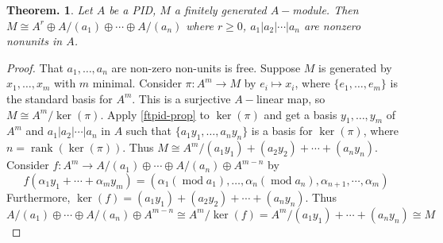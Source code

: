 \documentclass[11pt, a4paper]{memoir}
\theoremstyle{change}
\newtheorem{theorem}{Theorem.}[section]
\theoremstyle{plain}
\theoremstyle{nonumberplain}
\newtheorem{proof}{Proof}
\DeclareMathOperator{\rank}{rank}
\numberwithin{equation}{section}
\begin{document}
\begin{theorem}
    Let $A$ be a PID, $M$ a finitely generated $A-$module.
    Then $M\cong A^r\oplus A/(a_1)\oplus\cdots\oplus A/(a_n)$ where $r\geq 0$, $a_1|a_2|\cdots|a_n$ are nonzero nonunits in $A$.
\end{theorem}
\begin{proof}
    That $a_1,\ldots,a_n$ are non-zero non-units is free.
    Suppose $M$ is generated by $x_1,\ldots,x_m$ with $m$ minimal.
    Consider $\pi:A^m\to M$ by $e_i\mapsto x_i$, where $\{e_1,\ldots,e_m\}$ is the standard basis for $A^m$.
    This is a surjective $A-$linear map, so $M\cong A^m/\ker(\pi)$.
    Apply \cref{ftpid-prop} to $\ker(\pi)$ and get a basis $y_1,\ldots,y_m$ of $A^m$ and $a_1|a_2|\cdots|a_n$ in $A$ such that $\{a_1y_1,\ldots,a_ny_n\}$ is a basis for $\ker(\pi)$, where $n=\rank(\ker(\pi))$.
    Thus $M\cong A^m/(a_1y_1)+(a_2y_2)+\cdots+(a_ny_n)$.
    Consider $f:A^m\to A/(a_1)\oplus\cdots\oplus A/(a_n)\oplus A^{m-n}$ by
    \begin{equation*}
        f(\alpha_1y_1+\cdots+\alpha_m y_m)=(\alpha_1(\operatorname{mod}{a_1}),\ldots,\alpha_n(\operatorname{mod}{a_n}),\alpha_{n+1},\cdots,\alpha_m)
    \end{equation*}
    Furthermore, $\ker(f)=(a_1y_1)+(a_2y_2)+\cdots+(a_ny_n)$.
    Thus
    \begin{equation*}
        A/(a_1)\oplus\cdots\oplus A/(a_n)\oplus A^{m-n}\cong A^m/\ker(f)=A^m/(a_1y_1)+\cdots+(a_ny_n)\cong M
    \end{equation*}
\end{proof}
\end{document}

